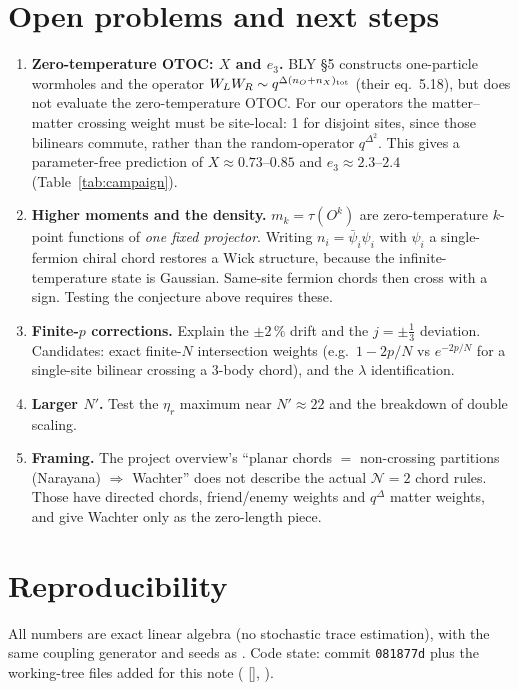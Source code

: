 \documentclass[11pt]{article}
\newcommand{\Np}{N'}
\theoremstyle{remark}
\begin{document}
\section{Open problems and next steps}
\begin{enumerate}\itemsep2pt
\item \textbf{Zero-temperature OTOC: $X$ and $e_3$.} BLY \S5 constructs one-particle wormholes and the operator
  $W_LW_R\sim q^{\Delta(n_O+n_X)_{\rm tot}}$ (their eq.~5.18), but does not evaluate the zero-temperature OTOC. For our
  operators the matter--matter crossing weight must be site-local: 1 for disjoint sites, since those bilinears
  commute, rather than the random-operator $q^{\Delta^2}$. This gives a parameter-free prediction of
  $X\approx0.73$--$0.85$ and $e_3\approx2.3$--$2.4$ (Table~\ref{tab:campaign}).
\item \textbf{Higher moments and the density.} $m_k=\tau(O^k)$ are zero-temperature $k$-point functions of \emph{one
  fixed projector}. Writing $n_i=\bar\psi_i\psi_i$ with $\psi_i$ a single-fermion chiral chord restores a Wick
  structure, because the infinite-temperature state is Gaussian. Same-site fermion chords then cross with a sign.
  Testing the conjecture above requires these.
\item \textbf{Finite-$p$ corrections.} Explain the $\pm2\,\%$ drift and the $j=\pm\frac13$ deviation. Candidates: exact
  finite-$N$ intersection weights (e.g.\ $1-2p/N$ vs $e^{-2p/N}$ for a single-site bilinear crossing a 3-body
  chord), and the $\lambda$ identification.
\item \textbf{Larger $\Np$.} Test the $\eta_r$ maximum near $\Np\approx22$ and the breakdown of double scaling.
\item \textbf{Framing.} The project overview's ``planar chords $=$ non-crossing partitions (Narayana) $\Rightarrow$
  Wachter'' does not describe the actual $\mathcal N{=}2$ chord rules. Those have directed chords, friend/enemy
  weights and $q^\Delta$ matter weights, and give Wachter only as the zero-length piece.
\end{enumerate}

\appendix
\section{Reproducibility}
All numbers are exact linear algebra (no stochastic trace estimation), with the same coupling generator and seeds
as . Code state: commit \texttt{081877d} plus the working-tree files added for this note
( [], ).
\end{document}
